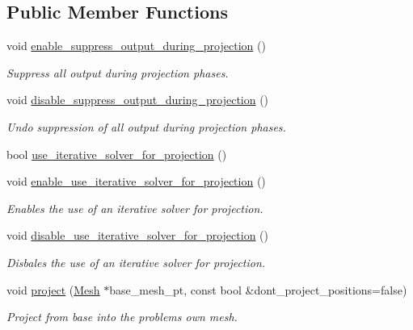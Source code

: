 \subsection*{Public Member Functions}
\begin{DoxyCompactItemize}
\item 
void \hyperlink{classoomph_1_1ProjectionProblem_a3706c034e47193038de20f3d40443a2c}{enable\+\_\+suppress\+\_\+output\+\_\+during\+\_\+projection} ()
\begin{DoxyCompactList}\small\item\em Suppress all output during projection phases. \end{DoxyCompactList}\item 
void \hyperlink{classoomph_1_1ProjectionProblem_ab9bb57b5e9241388b4f90b37e338c454}{disable\+\_\+suppress\+\_\+output\+\_\+during\+\_\+projection} ()
\begin{DoxyCompactList}\small\item\em Undo suppression of all output during projection phases. \end{DoxyCompactList}\item 
bool \hyperlink{classoomph_1_1ProjectionProblem_a5652035eda34f398652ede076dc085ae}{use\+\_\+iterative\+\_\+solver\+\_\+for\+\_\+projection} ()
\item 
void \hyperlink{classoomph_1_1ProjectionProblem_aefda55d76d58a951ef6714cbb998e358}{enable\+\_\+use\+\_\+iterative\+\_\+solver\+\_\+for\+\_\+projection} ()
\begin{DoxyCompactList}\small\item\em Enables the use of an iterative solver for projection. \end{DoxyCompactList}\item 
void \hyperlink{classoomph_1_1ProjectionProblem_aaf4b8fcb1f5f15cd95075a7da3e76cc5}{disable\+\_\+use\+\_\+iterative\+\_\+solver\+\_\+for\+\_\+projection} ()
\begin{DoxyCompactList}\small\item\em Disbales the use of an iterative solver for projection. \end{DoxyCompactList}\item 
void \hyperlink{classoomph_1_1ProjectionProblem_ad972f78212e515a03d1018996115265a}{project} (\hyperlink{classoomph_1_1Mesh}{Mesh} $\ast$base\+\_\+mesh\+\_\+pt, const bool \&dont\+\_\+project\+\_\+positions=false)
\begin{DoxyCompactList}\small\item\em Project from base into the problem\textquotesingle{}s own mesh. \end{DoxyCompactList}\end{DoxyCompactItemize}
